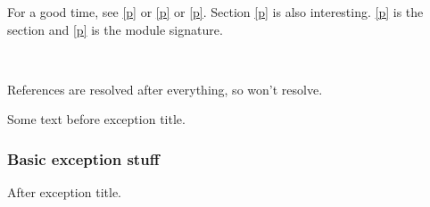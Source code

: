 For a good time, see \hyperref[Ocamlary-module-type-SuperSig-module-type-SubSigA--subSig]{[p\pageref*{Ocamlary-module-type-SuperSig-module-type-SubSigA--subSig}]} or \hyperref[Ocamlary-module-type-SuperSig-module-type-SubSigB--subSig]{[p\pageref*{Ocamlary-module-type-SuperSig-module-type-SubSigB--subSig}]} or \hyperref[Ocamlary-module-type-SuperSig-module-type-EmptySig]{[p\pageref*{Ocamlary-module-type-SuperSig-module-type-EmptySig}]}. Section \hyperref[Ocamlary--s9000]{[p\pageref*{Ocamlary--s9000}]} is also interesting. \hyperref[Ocamlary--emptySig]{[p\pageref*{Ocamlary--emptySig}]} is the section and \hyperref[Ocamlary-module-type-EmptySig]{[p\pageref*{Ocamlary-module-type-EmptySig}]} is the module signature.

\label{Ocamlary--module-Buffer}\label{Ocamlary-Buffer}\begin{ocamlindent}\label{Ocamlary-Buffer--val-f}\\
\end{ocamlindent}%
\begin{ocamlindent}References are resolved after everything, so  won't resolve.\end{ocamlindent}%
\medbreak
Some text before exception title.

\subsubsection{Basic exception stuff\label{Ocamlary--basic-exception-stuff}}%
After exception title.

